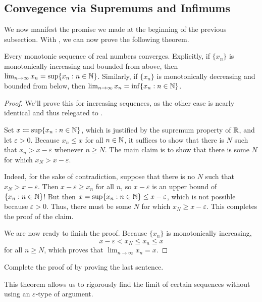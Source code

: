 \documentclass[../notes.tex]{subfiles}
\begin{document}
\subsection{Convegence via Supremums and Infimums}
We now manifest the promise we made at the beginning of the previous subsection. With , we can now prove the following theorem.
\begin{theorem} \label{thm:mono-inc-converges}
    Every monotonic sequence of real numbers converges. Explicitly, if $\{x_n\}$ is monotonically increasing and bounded from above, then $\lim_{n\to \infty}x_n = \sup\{x_n : n\in \mathbb N\}$. Similarly, if $\{x_n\}$ is monotonically decreasing and bounded from below, then $\lim_{n\to \infty}x_n = \inf\{x_n : n\in \mathbb N\}$.
\end{theorem}
\begin{proof}
    We'll prove this for increasing sequences, as the other case is nearly identical and thus relegated to .
    
    Set $x\coloneqq\sup\{x_n : n\in \mathbb N\}$, which is justified by the supremum property of $\mathbb R$, and let $\varepsilon>0$. Because $x_n\leq x$ for all $n\in \mathbb N$, it suffices to show that there is $N$ such that $x_n > x-\varepsilon$ whenever $n\geq N$. The main claim is to show that there is some $N$ for which $x_N>x-\varepsilon$.
    
    Indeed, for the sake of contradiction, suppose that there is no $N$ such that $x_N > x-\varepsilon$. Then $x-\varepsilon \geq x_n$ for all $n$, so $x-\varepsilon$ is an upper bound of $\{x_n : n\in \mathbb N\}$! But then $x=\sup\{x_n : n\in \mathbb N\} \leq x-\varepsilon$, which is not possible because $\varepsilon>0$. Thus, there must be some $N$ for which $x_N\geq x - \varepsilon$. This completes the proof of the claim.
    
    We are now ready to finish the proof. Because $\{x_n\}$ is monotonically increasing,
    \[x-\varepsilon < x_N \leq x_n \leq x\]
    for all $n\geq N$, which proves that $\lim_{n\to \infty}x_n =x$.
\end{proof}
\begin{exercise} \label{exe:mono-dec-converges}
    Complete the proof of  by proving the last sentence.
\end{exercise}
This theorem allows us to rigorously find the limit of certain sequences without using an $\varepsilon$-type of argument.
\end{document}
